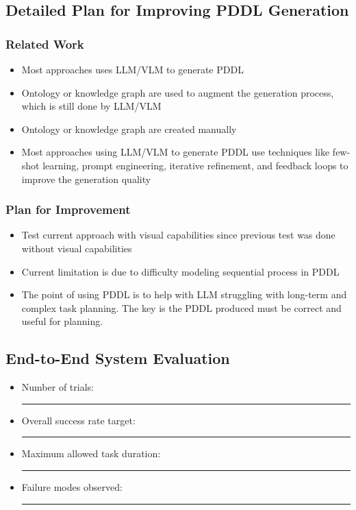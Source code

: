 \documentclass[12pt]{article}
\begin{document}

\subsection{Detailed Plan for Improving PDDL Generation}

\subsubsection{Related Work}
\begin{itemize}
    \item Most approaches uses LLM/VLM to generate PDDL
    \item Ontology or knowledge graph are used to augment the generation process, which is still done by LLM/VLM
    \item Ontology or knowledge graph are created manually
    \item Most approaches using LLM/VLM to generate PDDL use techniques like few-shot learning, prompt engineering, iterative refinement, and feedback loops to improve the generation quality
\end{itemize}

\subsubsection{Plan for Improvement}
\begin{itemize}
    \item Test current approach with visual capabilities since previous test was done without visual capabilities
    \item Current limitation is due to difficulty modeling sequential process in PDDL
    \item The point of using PDDL is to help with LLM struggling with long-term and complex task planning. The key is the PDDL produced must be correct and useful for planning.
\end{itemize}


\subsection{End-to-End System Evaluation}

\begin{itemize}
    \item Number of trials: \rule{4cm}{0.4pt}
    \item Overall success rate target: \rule{4cm}{0.4pt}
    \item Maximum allowed task duration: \rule{4cm}{0.4pt}
    \item Failure modes observed:\\
    \rule{0.9\linewidth}{0.4pt}
\end{itemize}
\end{document}
